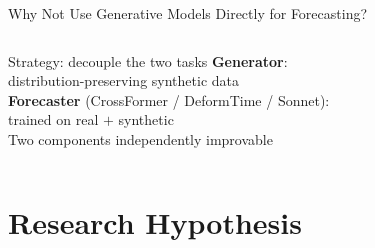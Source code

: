 \documentclass[aspectratio=169,10pt]{beamer}
\begin{document}
\begin{frame}{Why Not Use Generative Models Directly for Forecasting?}
\begin{columns}[T]
      \vspace{0.3em}
      \begin{alertblock}{Strategy: decouple the two tasks}
        \small
        \textbf{Generator}:\\
        distribution-preserving synthetic data\\[0.4em]
        \textbf{Forecaster} (CrossFormer / DeformTime / Sonnet):\\
        trained on real $+$ synthetic\\[0.4em]
     Two components independently improvable
      \end{alertblock}
  \end{columns}
\end{frame}

\section{Research Hypothesis}
\end{document}
